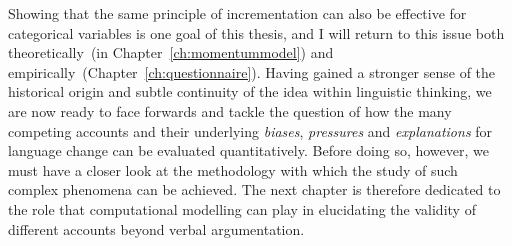 Showing that the same principle of incrementation can also be effective for categorical variables is one goal of this thesis, and I will return to this issue both theoretically~(in Chapter~\ref{ch:momentummodel}) and empirically~(Chapter~\ref{ch:questionnaire}). Having gained a stronger sense of the historical origin and subtle continuity of the idea within linguistic thinking, we are now ready to face forwards and tackle the question of how the many competing accounts and their underlying \emph{biases}, \emph{pressures} and \emph{explanations} for language change can be evaluated quantitatively.
Before doing so, however, we must have a closer look at the methodology with which the study of such complex phenomena can be achieved.
The next chapter is therefore dedicated to the role that computational modelling can play in elucidating the validity of different accounts beyond verbal argumentation.%






